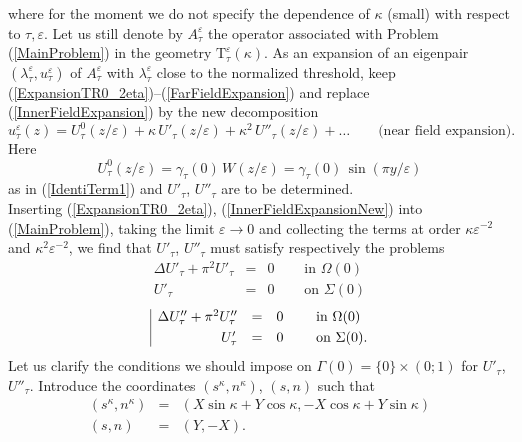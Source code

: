 \documentclass[11pt,a4paper]{article}
\newcommand{\eps}{\varepsilon}
\newcommand{\Om}{\Omega}
\begin{document}
where for the moment we do not specify the dependence of $\kappa$ (small) with respect to $\tau,\eps$. Let us still denote by $A^\eps_\tau$ the operator associated with Problem (\ref{MainProblem}) in the geometry $\mathrm{T}^\eps_\tau(\kappa)$. As an expansion of an eigenpair $(\lambda^\eps_\tau,u^\eps_\tau)$ of $A^\eps_\tau$ with $\lambda^\eps_\tau$ close to the normalized threshold, keep (\ref{ExpansionTR0_2eta})--(\ref{FarFieldExpansion}) and replace (\ref{InnerFieldExpansion}) by the new decomposition
\begin{equation}\label{InnerFieldExpansionNew}
u^\eps_\tau(z)=U^0_{\tau}(z/\eps)+\kappa\,U'_{\tau}(z/\eps)+\kappa^2\,U''_{\tau}(z/\eps)+\dots \qquad\mbox{(near field expansion).}
\end{equation}
Here 
\begin{equation}\label{IdentiTerm1Bis}
U^0_{\tau}(z/\eps)=\gamma_\tau(0)\,W(z/\eps)=\gamma_\tau(0)\,\sin(\pi y/\eps)
\end{equation}
as in (\ref{IdentiTerm1}) and $U'_{\tau}$, $U''_{\tau}$ are to be determined.\\
\newline
Inserting (\ref{ExpansionTR0_2eta}), (\ref{InnerFieldExpansionNew}) into (\ref{MainProblem}), taking the limit $\eps\to0$ and collecting the terms at order $\kappa\eps^{-2}$ and $\kappa^2\eps^{-2}$, we find that $U'_{\tau}$, $U''_{\tau}$ must satisfy respectively the problems
\begin{equation}\label{NearFieldPNew}
\begin{array}{|rcll}
\Delta U'_\tau+\pi^2U'_\tau&=&0&\quad\mbox{ in }\Om(0)\\[3pt]
U'_\tau&=&0&\quad\mbox{ on }\Sigma(0)
\end{array}
\end{equation}
\begin{equation}\label{NearFieldPP}
\begin{array}{|rcll}
\Delta U''_\tau+\pi^2U''_\tau&=&0&\quad\mbox{ in }\Om(0)\\[3pt]
U'_\tau&=&0&\quad\mbox{ on }\Sigma(0).
\end{array}\hspace{-0.15cm}
\end{equation}
Let us clarify the conditions we should impose on $\Gamma(0)=\{0\}\times(0;1)$ for $U'_\tau$, $U''_\tau$. Introduce the coordinates $(s^\kappa,n^\kappa)$, $(s,n)$ such that 
\[
\begin{array}{rcl}
(s^\kappa,n^\kappa)&=& (X\sin\kappa+Y\cos\kappa,-X\cos\kappa+Y\sin\kappa)\\[5pt]
(s,n)&=&(Y,-X).
\end{array}
\]
\end{document}
